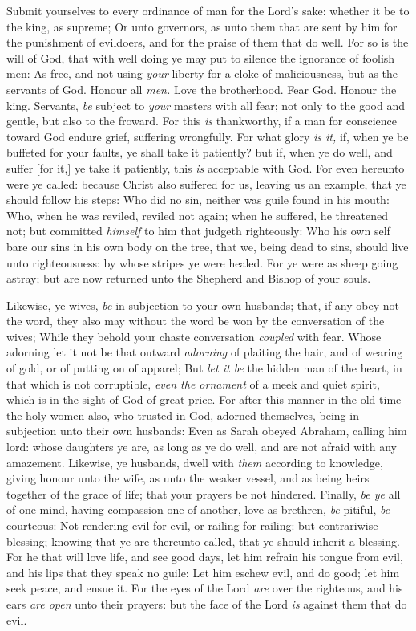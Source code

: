 \documentclass[11pt,letterpaper,oneside]{memoir}
\begin{document}
Submit yourselves to every ordinance of man for the Lord's sake: whether
it be to the king, as supreme; Or unto governors, as unto them that are
sent by him for the punishment of evildoers, and for the praise of them
that do well. For so is the will of God, that with well doing ye may put
to silence the ignorance of foolish men: As free, and not using
\emph{your} liberty for a cloke of maliciousness, but as the servants of
God. Honour all \emph{men.} Love the brotherhood. Fear God. Honour the
king. Servants, \emph{be} subject to \emph{your} masters with all fear;
not only to the good and gentle, but also to the froward. For this
\emph{is} thankworthy, if a man for conscience toward God endure grief,
suffering wrongfully. For what glory \emph{is it,} if, when ye be
buffeted for your faults, ye shall take it patiently? but if, when ye do
well, and suffer [for it,] ye take it patiently, this \emph{is}
acceptable with God. For even hereunto were ye called: because Christ
also suffered for us, leaving us an example, that ye should follow his
steps: Who did no sin, neither was guile found in his mouth: Who, when
he was reviled, reviled not again; when he suffered, he threatened not;
but committed \emph{himself} to him that judgeth righteously: Who his
own self bare our sins in his own body on the tree, that we, being dead
to sins, should live unto righteousness: by whose stripes ye were
healed. For ye were as sheep going astray; but are now returned unto the
Shepherd and Bishop of your souls.

Likewise, ye wives, \emph{be} in subjection to your own husbands; that,
if any obey not the word, they also may without the word be won by the
conversation of the wives; While they behold your chaste conversation
\emph{coupled} with fear. Whose adorning let it not be that outward
\emph{adorning} of plaiting the hair, and of wearing of gold, or of
putting on of apparel; But \emph{let it be} the hidden man of the heart,
in that which is not corruptible, \emph{even the ornament} of a meek and
quiet spirit, which is in the sight of God of great price. For after
this manner in the old time the holy women also, who trusted in God,
adorned themselves, being in subjection unto their own husbands: Even as
Sarah obeyed Abraham, calling him lord: whose daughters ye are, as long
as ye do well, and are not afraid with any amazement. Likewise, ye
husbands, dwell with \emph{them} according to knowledge, giving honour
unto the wife, as unto the weaker vessel, and as being heirs together of
the grace of life; that your prayers be not hindered. Finally, \emph{be
ye} all of one mind, having compassion one of another, love as brethren,
\emph{be} pitiful, \emph{be} courteous: Not rendering evil for evil, or
railing for railing: but contrariwise blessing; knowing that ye are
thereunto called, that ye should inherit a blessing. For he that will
love life, and see good days, let him refrain his tongue from evil, and
his lips that they speak no guile: Let him eschew evil, and do good; let
him seek peace, and ensue it. For the eyes of the Lord \emph{are} over
the righteous, and his ears \emph{are open} unto their prayers: but the
face of the Lord \emph{is} against them that do evil.
\end{document}
